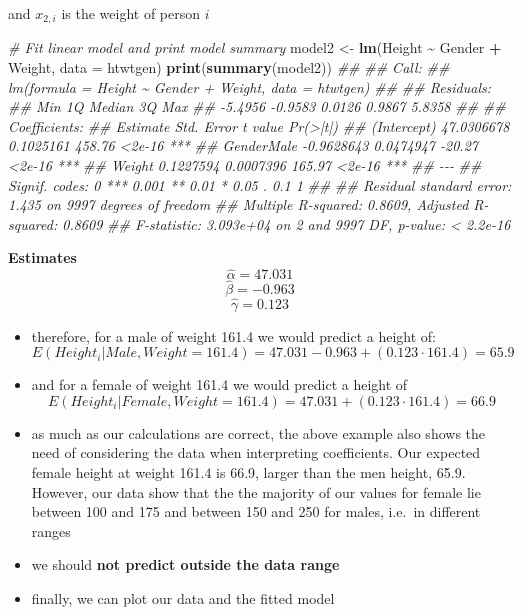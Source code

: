 \documentclass[
]{book}
\newenvironment{Shaded}{\begin{snugshade}}{\end{snugshade}}
\newcommand{\CommentTok}[1]{\textcolor[rgb]{0.56,0.35,0.01}{\textit{#1}}}
\newcommand{\DataTypeTok}[1]{\textcolor[rgb]{0.13,0.29,0.53}{#1}}
\newcommand{\KeywordTok}[1]{\textcolor[rgb]{0.13,0.29,0.53}{\textbf{#1}}}
\newcommand{\NormalTok}[1]{#1}
\newcommand{\OperatorTok}[1]{\textcolor[rgb]{0.81,0.36,0.00}{\textbf{#1}}}
\newcommand{\StringTok}[1]{\textcolor[rgb]{0.31,0.60,0.02}{#1}}
\providecommand{\tightlist}{%
  \setlength{\itemsep}{0pt}\setlength{\parskip}{0pt}}
\theoremstyle{definition}
\theoremstyle{definition}
\theoremstyle{definition}
\theoremstyle{remark}
\begin{document}
and \(x_{2,i}\) is the weight of person \(i\)

\begin{Shaded}
\begin{Highlighting}[]
\CommentTok{\# Fit linear model and print model summary}
\NormalTok{model2 \textless{}{-}}\StringTok{ }\KeywordTok{lm}\NormalTok{(Height }\OperatorTok{\textasciitilde{}}\StringTok{ }\NormalTok{Gender }\OperatorTok{+}\StringTok{ }\NormalTok{Weight, }\DataTypeTok{data =}\NormalTok{ htwtgen) }
\KeywordTok{print}\NormalTok{(}\KeywordTok{summary}\NormalTok{(model2))}
\CommentTok{\#\# }
\CommentTok{\#\# Call:}
\CommentTok{\#\# lm(formula = Height \textasciitilde{} Gender + Weight, data = htwtgen)}
\CommentTok{\#\# }
\CommentTok{\#\# Residuals:}
\CommentTok{\#\#     Min      1Q  Median      3Q     Max }
\CommentTok{\#\# {-}5.4956 {-}0.9583  0.0126  0.9867  5.8358 }
\CommentTok{\#\# }
\CommentTok{\#\# Coefficients:}
\CommentTok{\#\#               Estimate Std. Error t value Pr(\textgreater{}|t|)    }
\CommentTok{\#\# (Intercept) 47.0306678  0.1025161  458.76   \textless{}2e{-}16 ***}
\CommentTok{\#\# GenderMale  {-}0.9628643  0.0474947  {-}20.27   \textless{}2e{-}16 ***}
\CommentTok{\#\# Weight       0.1227594  0.0007396  165.97   \textless{}2e{-}16 ***}
\CommentTok{\#\# {-}{-}{-}}
\CommentTok{\#\# Signif. codes:  0 \textquotesingle{}***\textquotesingle{} 0.001 \textquotesingle{}**\textquotesingle{} 0.01 \textquotesingle{}*\textquotesingle{} 0.05 \textquotesingle{}.\textquotesingle{} 0.1 \textquotesingle{} \textquotesingle{} 1}
\CommentTok{\#\# }
\CommentTok{\#\# Residual standard error: 1.435 on 9997 degrees of freedom}
\CommentTok{\#\# Multiple R{-}squared:  0.8609,	Adjusted R{-}squared:  0.8609 }
\CommentTok{\#\# F{-}statistic: 3.093e+04 on 2 and 9997 DF,  p{-}value: \textless{} 2.2e{-}16}
\end{Highlighting}
\end{Shaded}

\textbf{Estimates}
\[\hat{\alpha} = 47.031\]
\[\hat{\beta} = -0.963\]
\[\hat{\gamma} = 0.123\]

\begin{itemize}
\tightlist
\item
  therefore, for a male of weight 161.4 we would predict a height of:
  \[E(Height_i|Male, Weight = 161.4) = 47.031 - 0.963 + (0.123 \cdot 161.4) = 65.9\]
\item
  and for a female of weight 161.4 we would predict a height of
  \[E(Height_i|Female, Weight = 161.4) = 47.031 + (0.123 \cdot 161.4) = 66.9\]
\item
  as much as our calculations are correct, the above example also shows the need of considering the data when interpreting coefficients. Our expected female height at weight 161.4 is 66.9, larger than the men height, 65.9. However, our data show that the the majority of our values for female lie between 100 and 175 and between 150 and 250 for males, i.e.~in different ranges
\item
  we should \textbf{not predict outside the data range}
\item
  finally, we can plot our data and the fitted model
\end{itemize}
\end{document}
